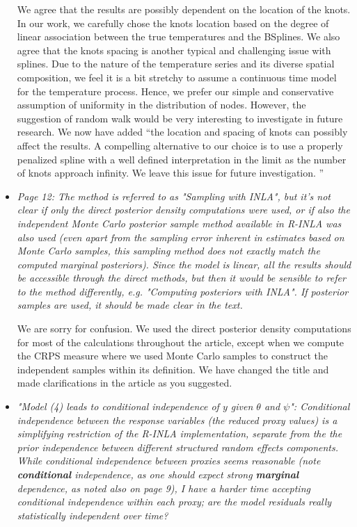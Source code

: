 \documentclass[11pt]{article}
\begin{document}
\begin{itemize}
We agree that the results are possibly dependent on the location of the knots. 
In our work, we carefully chose the knots location based on the degree of linear association between the true temperatures and the BSplines. 
We also agree that the knots spacing is another typical and challenging issue with splines. Due to the
nature of the temperature series and its diverse spatial composition, we feel it is a bit stretchy to assume a continuous time model for the temperature process.  Hence, we prefer our simple and conservative assumption of uniformity in the distribution of nodes. However, the suggestion of random walk would be very interesting to investigate in future research. We now have added ``the location and spacing of knots can possibly affect the results.  A compelling alternative to our choice is to use a properly penalized spline with a well
defined interpretation in the limit as the number of knots approach infinity. We leave this issue for future investigation. ''



\item \textit{Page 12: The method is referred to as "Sampling with INLA", but it's
  not clear if only the direct posterior density computations were
  used, or if also the independent Monte Carlo posterior sample method
  available in R-INLA was also used (even apart from the sampling
  error inherent in estimates based on Monte Carlo samples, this
  sampling method does not exactly match the computed marginal
  posteriors).  Since the model is linear, all the results should be
  accessible through the direct methods, but then it would be sensible
  to refer to the method differently, e.g. "Computing posteriors with
  INLA". If posterior samples are used, it should be made clear in the
  text.} 

We are sorry for confusion. We used the direct posterior density computations
for most of the calculations throughout the article, except when we compute the
CRPS measure where we used Monte Carlo samples to construct the independent
samples within its definition. We have changed the title and made clarifications in the article as you suggested.

\item \textit{"Model (4) leads to conditional independence of $y$ given $\theta$ and
  $\psi$": Conditional independence between the response variables (the
  reduced proxy values) is a simplifying restriction of the R-INLA
  implementation, separate from the the prior independence between
  different structured random effects components. While conditional
  independence between proxies seems reasonable (note \textbf{conditional}
  independence, as one should expect strong \textbf{marginal} dependence, as
  noted also on page 9), I have a harder time accepting conditional
  independence within each proxy; are the model residuals really
  statistically independent over time?}


\end{itemize}
\end{document}
